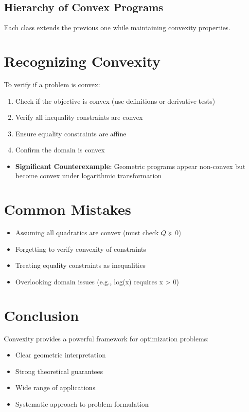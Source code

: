 \documentclass{article}
\theoremstyle{plain}
\begin{document}
\subsection{Hierarchy of Convex Programs} %
\begin{center}
\end{center}
Each class extends the previous one while maintaining convexity properties.

\section{Recognizing Convexity}
To verify if a problem is convex:
\begin{enumerate}
    \item Check if the objective is convex (use definitions or derivative tests)
    \item Verify all inequality constraints are convex
    \item Ensure equality constraints are affine
    \item Confirm the domain is convex
\end{enumerate}

\begin{itemize}
    \item \textbf{Significant Counterexample}: Geometric programs appear non-convex but become convex under logarithmic transformation
\end{itemize}

\section{Common Mistakes}
\begin{itemize}
    \item Assuming all quadratics are convex (must check \( Q \succeq 0 \))
    \item Forgetting to verify convexity of constraints
    \item Treating equality constraints as inequalities
    \item Overlooking domain issues (e.g., log(x) requires x > 0)
\end{itemize}

\section{Conclusion}
Convexity provides a powerful framework for optimization problems:
\begin{itemize}
    \item Clear geometric interpretation
    \item Strong theoretical guarantees
    \item Wide range of applications
    \item Systematic approach to problem formulation
\end{itemize}
\end{document}
